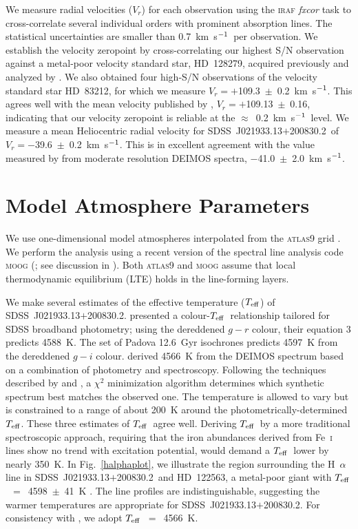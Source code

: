 \documentclass[useAMS,usenatbib,usegraphicx]{mn2e}
\def\kmsec{\mbox{km~s$^{\rm -1}$}}
\def\teff{\mbox{$T_{\rm eff}$}}
\def\seg{\mbox{SDSS~J021933.13$+$200830.2}}
\def\hd{\mbox{HD~122563}}
\begin{document}
We measure radial velocities ($V_{r}$) for each observation
using the \textsc{iraf} \textit{fxcor} task to cross-correlate
several individual orders with prominent absorption lines.
The statistical uncertainties are 
smaller than 0.7~\kmsec\ per observation.
We establish the velocity zeropoint by cross-correlating our
highest S/N observation against a metal-poor velocity standard
star, \mbox{HD~128279}, 
acquired previously and analyzed by \citet{roederer14}.
We also obtained four high-S/N observations 
of the velocity standard star
\mbox{HD~83212},
for which we measure $V_{r} = +$109.3~$\pm$~0.2~\kmsec.
This agrees well with the mean velocity published
by \citet{carney03},
$V_{r} = +$109.13~$\pm$~0.16,
indicating that our velocity zeropoint is reliable at the
$\approx$~0.2~\kmsec\ level.
We measure a mean Heliocentric radial velocity for \seg\ 
of $V_{r} = -$39.6~$\pm$~0.2~\kmsec.
This is in excellent agreement with the value measured by \citet{kirby13}
from moderate resolution DEIMOS spectra,
$-$41.0~$\pm$~2.0~\kmsec.


\section{Model Atmosphere Parameters}
\label{modelatm}


We use one-dimensional model atmospheres interpolated from the
\textsc{atlas9} grid \citep{castelli03}.
We perform the analysis using a recent version of the spectral
line analysis code \textsc{moog} 
(\citealt{sneden73}; see discussion in \citealt{sobeck11}).
Both \textsc{atlas9} and 
\textsc{moog} assume that local thermodynamic equilibrium
(LTE) holds in the line-forming layers.

We make several estimates of the effective temperature (\teff) of \seg.
\citet{ivezic08} presented a
colour-\teff\ relationship tailored for
SDSS broadband photometry; using the 
dereddened $g-r$ colour, their equation 3
predicts 4588~K.
The set of Padova 12.6~Gyr isochrones \citep{girardi02,bressan12}
predicts 4597~K from the dereddened $g-i$ colour.
\citet{kirby13} derived 4566~K from the DEIMOS spectrum
based on a combination of photometry and spectroscopy.
Following the techniques described by \citet{kirby08} and
\citet{kirby09,kirby10},
a $\chi^2$ minimization algorithm determines which
synthetic spectrum best matches the observed one.
The temperature is allowed to vary but is
constrained to a range of about 200~K around the 
photometrically-determined \teff.
These three estimates of \teff\ agree well.
Deriving \teff\ by a more traditional spectroscopic approach,
requiring that the iron abundances derived from Fe~\textsc{i} lines
show no trend with excitation potential, would demand
a \teff\ lower by nearly 350~K.
In Fig.~\ref{halphaplot}, we illustrate the region
surrounding the H~$\alpha$ line in \seg\ and \hd,
a metal-poor giant
with \teff~$=$~4598~$\pm$~41~K
\citep{creevey12}.
The line profiles are indistinguishable, suggesting
the warmer temperatures are appropriate for \seg.
For consistency with \citet{kirby13},
we adopt \teff~$=$~4566~K.
\end{document}
